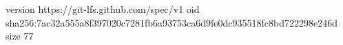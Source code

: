 version https://git-lfs.github.com/spec/v1
oid sha256:7ac32a555a8f397020c7281fb6a93753ca6d9fe0dc935518fc8bd722298e246d
size 77
